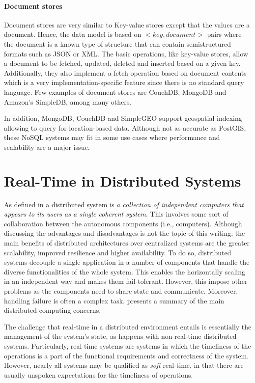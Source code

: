 \paragraph{Document stores}

Document stores are very similar to Key-value stores except that the values are a document. Hence, the data model is based on ${<key, document>}$ pairs where the document is a known type of structure that can contain semistructured formats such as JSON or XML. The basic operations, like key-value stores, allow a document to be fetched, updated, deleted and inserted based on a given key. Additionally, they also implement a fetch operation based on document contents which is a very implementation-specific feature since there is no standard query language. Few examples of document stores are CouchDB, MongoDB and Amazon's SimpleDB, among many others.  

In addition, MongoDB, CouchDB and SimpleGEO support geospatial indexing allowing to query for location-based data. Although not as accurate as PostGIS, these NoSQL systems may fit in some use cases where performance and scalability are a major issue.

\section{Real-Time in Distributed Systems}

As defined in \cite{distributed-systems-book} a distributed system is \textit{a collection of independent computers that appears to its users as a single coherent system}. This involves some sort of collaboration between the autonomous components (i.e., computers). Although discussing the advantages and disadvantages is not the topic of this writing, the main benefits of distributed architectures over centralized systems are the greater scalability, improved resilience and higher availability. To do so, distributed systems decouple a single application in a number of components that handle the diverse functionalities of the whole system. This enables the horizontally scaling in an independent way and makes them fail-tolerant. However, this impose other problems as the components need to share state and communicate. Moreover, handling failure is often a complex task. \cite{DT-fallacies} presents a summary of the main distributed computing concerns.

The challenge that real-time in a distributed environment entails is essentially the management of the system's state, as happens with non-real-time distributed systems. Particularly, real time systems are systems in which the timeliness of the operations is a part of the functional requirements and correctness of the system. However, nearly all systems may be qualified as \textit{soft} real-time, in that there are usually unspoken expectations for the timeliness of operations.

